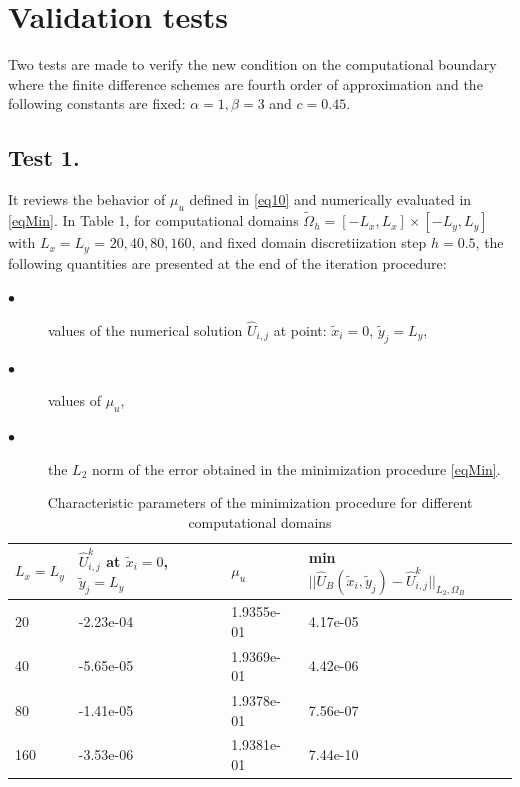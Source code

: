 \documentclass[12pt]{article}
\theoremstyle{theorem}
\theoremstyle{defi}
\begin{document}
\section{Validation tests}

Two tests are made to verify the new condition on the computational boundary where the finite difference schemes are fourth order of approximation and the following constants are fixed:
 $\alpha = 1, \beta = 3$  and  $c = 0.45$.

\subsection{Test 1.}

It reviews the behavior of $\mu_u$  defined in  \eqref{eq10} and numerically evaluated in \eqref{eqMin}. In Table 1, for computational domains  $\tilde \Omega_h = [-L_{ x}, L_{ x}] \times  [-L_{ y}, L_{ y}]$
with $ L_{ x} = L_{ y}$ = $20, 40, 80, 160$, and fixed domain discretiization step $h = 0.5$, the following quantities are presented at the end of the iteration procedure:

\begin{description}
  \item[$\bullet$]values of the numerical solution $\widehat{U}_{i,j}$  at point: $\tilde {x}_i = 0$, $ \tilde {y}_j =   L_{ y}$,
  \item[$\bullet$ ] values of $\mu_u$,
  \item[$\bullet$ ] the $L_2$  norm of the error obtained in the minimization procedure \eqref{eqMin}.
\end{description}


\begin{center}
\begin{table}[ht]
\centering
		\begin{tabular}{||C{1.5cm}||C{2.6cm}|C{1.9cm}|C{4.2cm}||}
			\hline
			\hline
      $ L_{ x} = L_{ y}$        &         $\widehat{U}_{i,j}^k$ at  $\tilde {x}_i = 0$, $ \tilde {y}_j =   L_{ y}$    &    $\mu_u$  &  min \mbox{ $|| \widehat  U_B( \tilde x_i, \tilde y_j) - \widehat U ^k_{i,j} ||_{L_2,\Omega_B}$}\\
   			\hline
			    & -2.23e-04    &  1.9355e-01  &     4.17e-05  \\
               	       & -5.65e-05   &   1.9369e-01    &    4.42e-06 \\
			    & -1.41e-05  &      1.9378e-01      &       7.56e-07  \\
			     & -3.53e-06  &    1.9381e-01        &     7.44e-10 \\
		   \hline
	             \hline
                     \end{tabular}
\caption{Characteristic parameters of the minimization procedure for different computational domains}
\label{tab:fourth-der}
\end{table}
\end{center}
\end{document}

